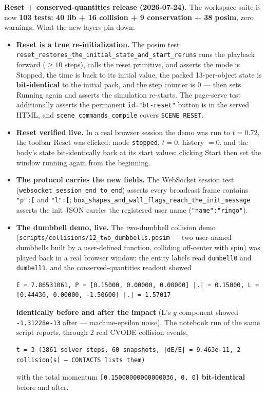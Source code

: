 \documentclass[11pt]{article}
\newcommand{\kw}[1]{\texttt{\uppercase{#1}}}
\newcommand{\code}[1]{\texttt{#1}}
\begin{document}
\textbf{Reset + conserved-quantities release (2026-07-24).} The
workspace suite is now \textbf{103 tests: 40 lib + 16 collision + 9
conservation + 38 posim}, zero warnings. What the new layers pin
down:

\begin{itemize}
\item \textbf{Reset is a true re-initialization.} The posim test
      \code{reset\_restores\_the\_initial\_state\_and\_start\_reruns}
      runs the playback forward ($\geq 10$ steps), calls the reset
      primitive, and asserts the mode is Stopped, the time is back to
      its initial value, the packed 13-per-object state is
      \textbf{bit-identical} to the initial pack, and the step
      counter is 0 --- then sets Running again and asserts the
      simulation re-starts. The page-serve test additionally asserts
      the permanent \code{id="bt-reset"} button is in the served
      HTML, and \code{scene\_commands\_compile} covers
      \kw{scene reset}.
\item \textbf{Reset verified live.} In a real browser session the
      demo was run to $t = 0.72$, the toolbar Reset was clicked: mode
      \code{stopped}, $t = 0$, history $= 0$, and the body's state
      bit-identically back at its start values; clicking Start then
      set the window running again from the beginning.
\item \textbf{The protocol carries the new fields.} The WebSocket
      session test (\code{websocket\_session\_end\_to\_end}) asserts
      every broadcast frame contains \code{"p":[} and \code{"l":[};
      \code{box\_shapes\_and\_wall\_flags\_reach\_the\_init\_message}
      asserts the init JSON carries the registered user name
      (\code{"name":"ringo"}).
\item \textbf{The dumbbell demo, live.} The two-dumbbell collision
      demo (\code{scripts/collisions/12\_two\_dumbbells.posim} ---
      two user-named dumbbells built by a user-defined function,
      colliding off-center with spin) was played back in a real
      browser window: the entity labels read \code{dumbell0} and
      \code{dumbell1}, and the conserved-quantities readout showed
\begin{lstlisting}
E = 7.86531061, P = [0.15000, 0.00000, 0.00000] |.| = 0.15000, L = [0.44430, 0.00000, -1.50600] |.| = 1.57017
\end{lstlisting}
      \textbf{identically before and after the impact} (L's $y$
      component showed \code{-1.31228e-13} after ---
      machine-epsilon noise). The notebook run of the same script
      reports, through 2 real CVODE collision events,
\begin{lstlisting}
t = 3 (3861 solver steps, 60 snapshots, |dE/E| = 9.463e-11, 2 collision(s) — CONTACTS lists them)
\end{lstlisting}
      with the total momentum \code{[0.15000000000000036, 0, 0]}
      \textbf{bit-identical} before and after.
\end{itemize}
\end{document}
